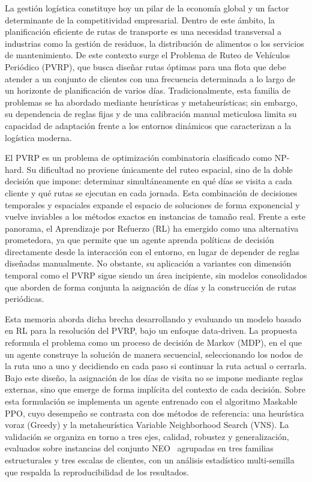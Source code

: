 
La gestión logística constituye hoy un pilar de la economía global y un factor determinante de la competitividad empresarial. Dentro de este ámbito, la planificación eficiente de rutas de transporte es una necesidad transversal a industrias como la gestión de residuos, la distribución de alimentos o los servicios de mantenimiento. De este contexto surge el Problema de Ruteo de Vehículos Periódico (PVRP), que busca diseñar rutas óptimas para una flota que debe atender a un conjunto de clientes con una frecuencia determinada a lo largo de un horizonte de planificación de varios días. Tradicionalmente, esta familia de problemas se ha abordado mediante heurísticas y metaheurísticas; sin embargo, su dependencia de reglas fijas y de una calibración manual meticulosa limita su capacidad de adaptación frente a los entornos dinámicos que caracterizan a la logística moderna.

El PVRP es un problema de optimización combinatoria clasificado como NP-hard. Su dificultad no proviene únicamente del ruteo espacial, sino de la doble decisión que impone: determinar simultáneamente en qué días se visita a cada cliente y qué rutas se ejecutan en cada jornada. Esta combinación de decisiones temporales y espaciales expande el espacio de soluciones de forma exponencial y vuelve inviables a los métodos exactos en instancias de tamaño real. Frente a este panorama, el Aprendizaje por Refuerzo (RL) ha emergido como una alternativa prometedora, ya que permite que un agente aprenda políticas de decisión directamente desde la interacción con el entorno, en lugar de depender de reglas diseñadas manualmente. No obstante, su aplicación a variantes con dimensión temporal como el PVRP sigue siendo un área incipiente, sin modelos consolidados que aborden de forma conjunta la asignación de días y la construcción de rutas periódicas.

Esta memoria aborda dicha brecha desarrollando y evaluando un modelo basado en RL para la resolución del PVRP, bajo un enfoque data-driven. La propuesta reformula el problema como un proceso de decisión de Markov (MDP), en el que un agente construye la solución de manera secuencial, seleccionando los nodos de la ruta uno a uno y decidiendo en cada paso si continuar la ruta actual o cerrarla. Bajo este diseño, la asignación de los días de visita no se impone mediante reglas externas, sino que emerge de forma implícita del contexto de cada decisión. Sobre esta formulación se implementa un agente entrenado con el algoritmo Maskable PPO, cuyo desempeño se contrasta con dos métodos de referencia: una heurística voraz (Greedy) y la metaheurística Variable Neighborhood Search (VNS). La validación se organiza en torno a tres ejes, calidad, robustez y generalización, evaluados sobre instancias del conjunto NEO~\cite{NEO2013} agrupadas en tres familias estructurales y tres escalas de clientes, con un análisis estadístico multi-semilla que respalda la reproducibilidad de los resultados.


